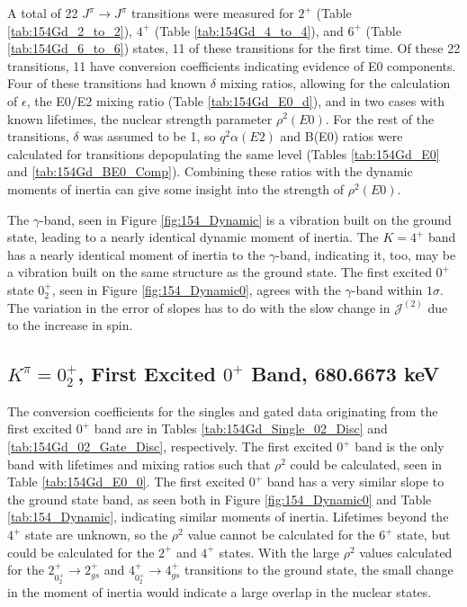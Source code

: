A total of 22 $J^{\pi}\rightarrow J^{\pi}$ transitions were measured for $2^+$ (Table \ref{tab:154Gd_2_to_2}), $4^+$ (Table \ref{tab:154Gd_4_to_4}), and $6^+$ (Table \ref{tab:154Gd_6_to_6}) states, 11 of these transitions for the first time. Of these 22 transitions, 11 have conversion coefficients indicating evidence of E0 components. Four of these transitions had known $\delta$ mixing ratios, allowing for the calculation of $\epsilon$, the E0/E2 mixing ratio (Table \ref{tab:154Gd_E0_d}), and in two cases with known lifetimes, the nuclear strength parameter $\rho^2(E0)$. For the rest of the transitions, $\delta$ was assumed to be 1, so $q^2\alpha(E2)$ and B(E0) ratios were calculated for transitions depopulating the same level (Tables \ref{tab:154Gd_E0} and \ref{tab:154Gd_BE0_Comp}). Combining these ratios with the dynamic moments of inertia can give some insight into the strength of $\rho^2(E0)$.







The $\gamma$-band, seen in Figure \ref{fig:154_Dynamic} is a vibration built on the ground state, leading to a nearly identical dynamic moment of inertia. The $K=4^+$ band has a nearly identical moment of inertia to the $\gamma$-band, indicating it, too, may be a vibration built on the same structure as the ground state. The first excited $0^+$ state $0^+_2$, seen in Figure \ref{fig:154_Dynamic0}, agrees with the $\gamma$-band within $1\sigma$. The variation in the error of slopes has to do with the slow change in $\mathcal{J}^{(2)}$ due to the increase in spin. 

\subsection{$K^{\pi}=0^+_2$, First Excited $0^+$ Band, 680.6673 keV}

The conversion coefficients for the singles and gated data originating from the first excited $0^+$ band are in Tables \ref{tab:154Gd_Single_02_Disc} and \ref{tab:154Gd_02_Gate_Disc}, respectively. The first excited $0^+$ band is the only band with lifetimes and mixing ratios such that $\rho^2$ could be calculated, seen in Table \ref{tab:154Gd_E0_0}. The first excited $0^+$ band has a very similar slope to the ground state band, as seen both in Figure \ref{fig:154_Dynamic0} and Table \ref{tab:154_Dynamic}, indicating similar moments of inertia. Lifetimes beyond the $4^+$ state are unknown, so the $\rho^2$ value cannot be calculated for the $6^+$ state, but could be calculated for the $2^+$ and $4^+$ states. With the large $\rho^2$ values calculated for the $2^+_{0^+_2}\rightarrow 2^+_{gs}$ and $4^+_{0^+_2}\rightarrow 4^+_{gs}$ transitions to the ground state, the small change in the moment of inertia would indicate a large overlap in the nuclear states. 

